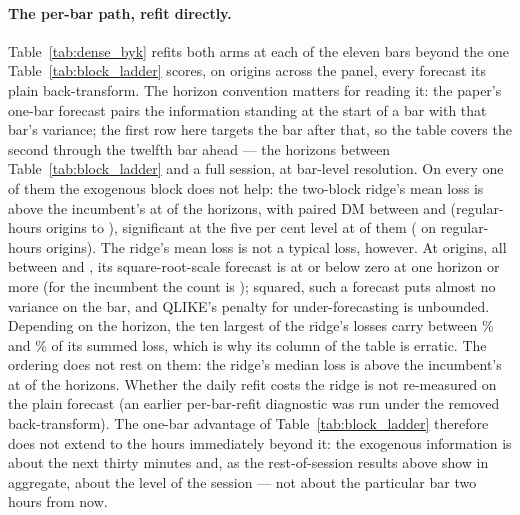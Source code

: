 \paragraph{The per-bar path, refit directly.}
Table~\ref{tab:dense_byk} refits both arms at each of the eleven bars
beyond the one Table~\ref{tab:block_ladder} scores, on \dmhN{} origins
across the panel, every forecast its plain back-transform. The horizon
convention matters for reading it: the
paper's one-bar forecast pairs the information standing at the start of
a bar with that bar's variance; the first row here targets the bar
after that, so the table covers the second through the twelfth bar
ahead --- the horizons between Table~\ref{tab:block_ladder} and a full
session, at bar-level resolution.
On every one of them the exogenous block does not help: the two-block
ridge's mean loss is above the incumbent's at \dmhBlkWorseN{} of the
\dmhNK{} horizons, with paired DM between \dmhDMmin{} and \dmhDMmax{}
(regular-hours origins \dmhRthDMmin{} to \dmhRthDMmax{}), significant at
the five per cent level at \dmhBlkSigN{} of them (\dmhRthBlkSigN{} on
regular-hours origins). The ridge's mean loss is not a typical loss,
however. At \dmhBlkNonposN{} origins, all between \dmhBlkNonposFirst{}
and \dmhBlkNonposLast{}, its square-root-scale forecast is at or below
zero at one horizon or more (for the incumbent the count is
\dmhAzeroNonposN{});
squared, such a forecast puts almost no variance on the bar, and
QLIKE's penalty for under-forecasting is unbounded. Depending on the
horizon, the ten largest of the ridge's losses carry between
\dmhTopTenMin{}\% and \dmhTopTenMax{}\% of its summed loss, which is why
its column of the table is erratic. The ordering does not rest on them:
the ridge's median loss is above the incumbent's at
\dmhMedBlkWorseN{} of the \dmhNK{} horizons. Whether the daily refit
costs the ridge is not re-measured on the plain forecast (an earlier
per-bar-refit diagnostic was run under the removed back-transform).
The one-bar advantage of
Table~\ref{tab:block_ladder} therefore does not extend to the hours
immediately beyond it: the exogenous information is about the next
thirty minutes and, as the rest-of-session results above show in
aggregate, about the level of the session --- not about the particular
bar two hours from now.

